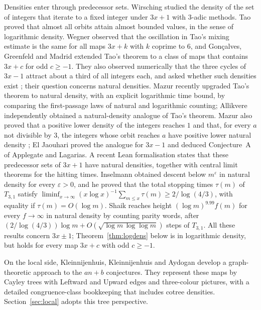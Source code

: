 \documentclass[12pt]{amsart}
\theoremstyle{definition}
\theoremstyle{remark}
\begin{document}
Densities enter through predecessor sets. Wirsching \cite{Wirsching_1998} studied the density of the set of integers that iterate to a fixed integer under $3x+1$ with $3$-adic methods. Tao \cite{Tao_2022} proved that almost all orbits attain almost bounded values, in the sense of logarithmic density. Wegner \cite{Wegner_2021} observed that the oscillation in Tao's mixing estimate is the same for all maps $3x+k$ with $k$ coprime to $6$, and Gon\c{c}alves, Greenfeld and Madrid \cite{GGM_2025} extended Tao's theorem to a class of maps that contains $3x+c$ for odd $c\ge-1$. They also observed numerically that the three cycles of $3x-1$ attract about a third of all integers each, and asked whether such densities exist \cite[Remark~1.7]{GGM_2025}; their question concerns natural densities. Mazur \cite{Mazur_2026} recently upgraded Tao's theorem to natural density, with an explicit logarithmic time bound, by comparing the first-passage laws of natural and logarithmic counting; Allikvere \cite{Allikvere_2026} independently obtained a natural-density analogue of Tao's theorem. Mazur also proved that a positive lower density of the integers reaches $1$ \cite{Mazur_PD_2026} and that, for every $a$ not divisible by $3$, the integers whose orbit reaches $a$ have positive lower natural density \cite{Mazur_Pred_2026}; El Jaouhari \cite{ElJaouhari_2026} proved the analogue for $3x-1$ and deduced Conjecture~A of Applegate and Lagarias. A recent Lean formalisation \cite{CLT_2026} states that these predecessor sets of $3x+1$ have natural densities, together with central limit theorems for the hitting times. Inselmann \cite{Inselmann_2024} obtained descent below $m^\varepsilon$ in natural density for every $\varepsilon>0$, and he proved that the total stopping times $\tau(m)$ of $T_{3,1}$ satisfy $\liminf_{x\to\infty}(x\log x)^{-1}\sum_{m\le x}\tau(m)\ge2/\log(4/3)$, with equality if $\tau(m)=O(\log m)$. Shaik \cite{Shaik_2026} reaches height $(\log m)^{9.99}f(m)$ for every $f\to\infty$ in natural density by counting parity words, after $(2/\log(4/3))\log m+O(\sqrt{\log m\,\log\log m})$ steps of $T_{3,1}$. All these results concern $3x\pm1$; Theorem~\ref{thm:logdens} below is in logarithmic density, but holds for every map $3x+c$ with odd $c\ge-1$.

On the local side, Kleinnijenhuis, Kleinnijenhuis and Aydogan \cite{Kleinnijenhuis_2026} develop a graph-theoretic approach to the $an+b$ conjectures. They represent these maps by Cayley trees with Leftward and Upward edges and three-colour pictures, with a detailed congruence-class bookkeeping that includes cotree densities. Section~\ref{sec:local} adopts this tree perspective.
\end{document}
